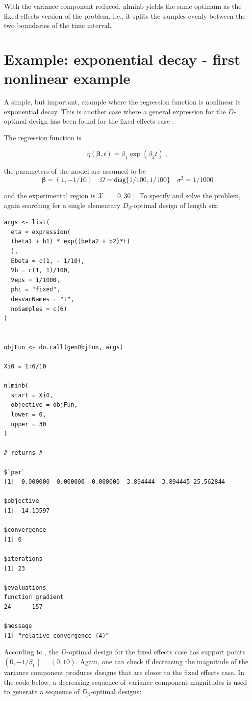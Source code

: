 \documentclass{article}
\newcommand*{\bbeta}{\boldsymbol \beta}
\theoremstyle{example}
\begin{document}
	With the variance component reduced, \textsf{nlminb} yields the same optimum as the fixed effects version of the problem, i.e., it splits the samples evenly between the two boundaries of the time interval.	

	
	\section{Example: exponential decay - first nonlinear example}
	
	A simple, but important, example where the regression function is nonlinear is exponential decay.
	This is another case where a general expression for the $D$-optimal design has been found for the fixed effects case \citep{Kitsos2013}.
	
	The regression function is
	
	\[
	\eta(\bbeta , t) = \beta_1 \exp ( \beta_2 t) \ ,
	\]
	
	the parameters of the model are assumed to be 
	\[
	\bbeta = (1, - 1/10 )
	\quad
	\Omega = \textsf{diag}\{1/100, 1/100\}
	\quad
	\sigma^2 = 1/1000
	\]
	
	and the experimental region is $\mathcal X = [0, 30]$.
	To specify and solve the problem, again searching for a single elementary $D_\beta$-optimal design of length six:
	
	\begin{verbatim}
args <- list(
  eta = expression(
  (beta1 + b1) * exp((beta2 + b2)*t)
  ), 
  Ebeta = c(1, - 1/10), 
  Vb = c(1, 1)/100, 
  Veps = 1/1000, 
  phi = "fixed",
  desvarNames = "t",
  noSamples = c(6)
)


objFun <- do.call(genObjFun, args)

Xi0 = 1:6/10

nlminb(
  start = Xi0,
  objective = objFun,
  lower = 0,
  upper = 30
)

# returns #

$`par`
[1]  0.000000  0.000000  0.000000  3.894444  3.894445 25.562844

$objective
[1] -14.13597

$convergence
[1] 0

$iterations
[1] 23

$evaluations
function gradient 
24      157 

$message
[1] "relative convergence (4)"
	\end{verbatim}
	
	
	According to \cite{Kitsos2013}, the $D$-optimal design for the fixed effects case has support points $(0, - 1/\beta_1) = (0, 10)$.
	Again, one can check if decreasing the magnitude of the variance component produces designs that are closer to the fixed effects case.
	In the code below, a decreasing sequence of variance component magnitudes is used to generate a sequence of $D_\beta$-optimal designs:
	
\end{document}
